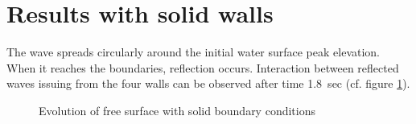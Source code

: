\section{Results with solid walls}
%

The wave spreads circularly around the initial water surface peak elevation.
When it reaches the boundaries, reflection
occurs. Interaction between reflected waves issuing from the four walls can be
observed after time 1.8~sec (cf. figure \ref{t2d:gouttedo:walls_evol}).

\begin{figure}[H]
\begin{minipage}[t]{0.50\textwidth}
 \centering
\end{minipage}%
\begin{minipage}[t]{0.50\textwidth}
 \centering
\end{minipage}
\begin{minipage}[t]{0.50\textwidth}
 \centering
\end{minipage}%
\begin{minipage}[t]{0.50\textwidth}
 \centering
\end{minipage}
\begin{minipage}[t]{0.50\textwidth}
 \centering
\end{minipage}%
\begin{minipage}[t]{0.50\textwidth}
 \centering
\end{minipage}
\begin{minipage}[t]{0.50\textwidth}
 \centering
\end{minipage}%
\begin{minipage}[t]{0.50\textwidth}
 \centering
\end{minipage}
\caption{Evolution of free surface with solid boundary conditions}
\label{t2d:gouttedo:walls_evol}
\end{figure}

